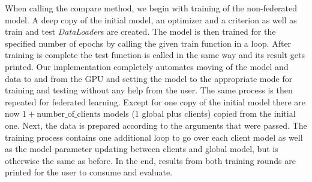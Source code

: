 When calling the compare method, we begin with training of the non-federated model. A deep copy of the initial model, an optimizer and a criterion as well as train and test \textit{DataLoader}s are created. The model is then trained for the specified number of epochs by calling the given train function in a loop. After training is complete the test function is called in the same way and its result gets printed. Our implementation completely automates moving of the model and data to and from the GPU and setting the model to the appropriate mode for training and testing without any help from the user.
The same process is then repeated for federated learning. Except for one copy of the initial model there are now $ 1 + \text{number\_of\_clients} $ models (1 global plus clients) copied from the initial one. Next, the data is prepared according to the arguments that were passed. The training process contains one additional loop to go over each client model as well as the model parameter updating between clients and global model, but is otherwise the same as before.
In the end, results from both training rounds are printed for the user to consume and evaluate.